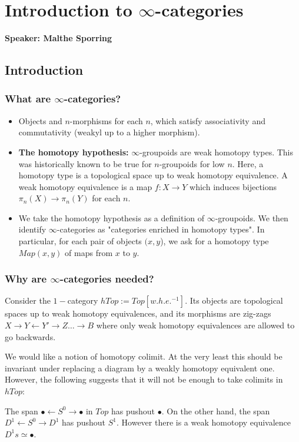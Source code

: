 \section{Introduction to $\infty$-categories}
\textbf{Speaker: Malthe Sporring}

\subsection{Introduction}
\subsubsection{What are $\infty$-categories?}
\begin{itemize}
    \item Objects and $n$-morphisms for each $n$, which satisfy associativity and commutativity (weakyl up to a higher morphism).
    \item \textbf{The homotopy hypothesis:} $\infty$-groupoids are weak homotopy types. This was historically known to be true for $n$-groupoids for low $n$. Here, a  homotopy type is a topological space up to weak homotopy equivalence. A weak homotopy equivalence is a map $f:X\rightarrow Y$ which induces bijections $\pi_n(X)\rightarrow \pi_n(Y)$ for each $n$.
    \item We take the homotopy hypothesis as a definition of $\infty$-groupoids. We then identify $\infty$-categories as "categories enriched in homotopy types". In particular, for each pair of objects $(x,y$), we ask for a homotopy type $Map(x,y)$ of maps from $x$ to $y$.
\end{itemize}

\subsubsection{Why are $\infty$-categories needed?}
Consider the $1-$category $hTop:=Top[w.h.e.^{-1}]$. Its objects are topological spaces up to weak homotopy equivalences, and its morphisms are zig-zags $X\rightarrow Y\leftarrow Y'\rightarrow Z\dots \rightarrow B$ where only weak homotopy equivalences are allowed to go backwards.

We would like a notion of homotopy colimit. At the very least this should be invariant under replacing a diagram by a weakly homotopy equivalent one. However, the following suggests that it will not be enough to take colimits in $hTop$:

\begin{remark}
    The span $\bullet \leftarrow S^0\rightarrow \bullet$ in $Top$ has pushout $\bullet$. On the other hand, the span $D^1 \leftarrow S^0\rightarrow D^1$ has pushout $S^1.$ However there is a weak homotopy equivalence  $D^1s \simeq \bullet$.
\end{remark}

